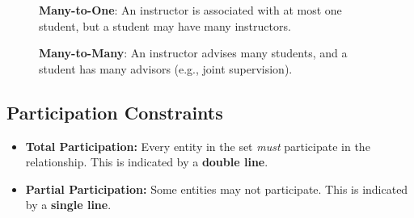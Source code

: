 \documentclass[12pt,a4paper]{article}
\begin{document}
\begin{figure}[H]
    \centering
    \caption{\textbf{Many-to-One}: An instructor is associated with at most one student, but a student may have many instructors.}
\end{figure}

\begin{figure}[H]
    \centering
    \caption{\textbf{Many-to-Many}: An instructor advises many students, and a student has many advisors (e.g., joint supervision).}
\end{figure}

\subsection{Participation Constraints}
\begin{itemize}
    \item \textbf{Total Participation:} Every entity in the set \textit{must} participate in the relationship. This is indicated by a \textbf{double line}.
    \item \textbf{Partial Participation:} Some entities may not participate. This is indicated by a \textbf{single line}.
\end{itemize}
\end{document}
